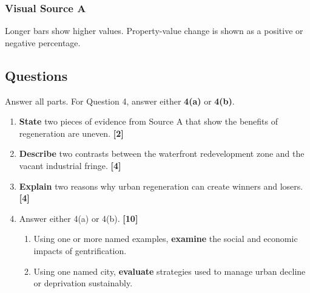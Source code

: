\documentclass[11pt,a4paper]{article}
\newcommand{\term}[1]{\textcolor{HeadingBlue}{\textbf{#1}}}
\newcommand{\exam}[1]{\textcolor{AccentTeal}{\textbf{#1}}}
\newcommand{\markpts}[1]{\hfill\textbf{[#1]}}
\begin{document}
\subsubsection{Visual Source A}

Longer bars show higher values. Property-value change is shown as a positive
or negative percentage.

\begin{center}
\end{center}

\subsection{Questions}

Answer all parts. For Question 4, answer either \term{4(a)} or \term{4(b)}.

\begin{enumerate}
  \item \exam{State} two pieces of evidence from Source A that show the
  benefits of regeneration are uneven. \markpts{2}

  \item \exam{Describe} two contrasts between the waterfront redevelopment zone
  and the vacant industrial fringe. \markpts{4}

  \item \exam{Explain} two reasons why urban regeneration can create winners
  and losers. \markpts{4}

  \item Answer either 4(a) or 4(b). \markpts{10}
  \begin{enumerate}[label=\textbf{\alph*.},leftmargin=1.6em]
    \item Using one or more named examples, \exam{examine} the social and
    economic impacts of gentrification.

    \item Using one named city, \exam{evaluate} strategies used to manage urban
    decline or deprivation sustainably.
  \end{enumerate}
\end{enumerate}
\end{document}
